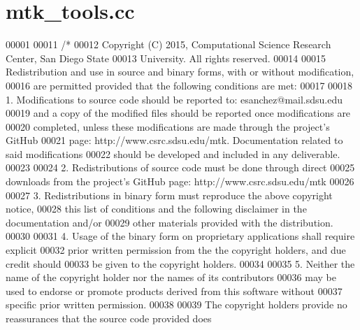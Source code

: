 \hypertarget{mtk__tools_8cc_source}{\section{mtk\+\_\+tools.\+cc}
\label{mtk__tools_8cc_source}
}

\begin{DoxyCode}
00001 
00011 \textcolor{comment}{/*}
00012 \textcolor{comment}{Copyright (C) 2015, Computational Science Research Center, San Diego State}
00013 \textcolor{comment}{University. All rights reserved.}
00014 \textcolor{comment}{}
00015 \textcolor{comment}{Redistribution and use in source and binary forms, with or without modification,}
00016 \textcolor{comment}{are permitted provided that the following conditions are met:}
00017 \textcolor{comment}{}
00018 \textcolor{comment}{1. Modifications to source code should be reported to: esanchez@mail.sdsu.edu}
00019 \textcolor{comment}{and a copy of the modified files should be reported once modifications are}
00020 \textcolor{comment}{completed, unless these modifications are made through the project's GitHub}
00021 \textcolor{comment}{page: http://www.csrc.sdsu.edu/mtk. Documentation related to said modifications}
00022 \textcolor{comment}{should be developed and included in any deliverable.}
00023 \textcolor{comment}{}
00024 \textcolor{comment}{2. Redistributions of source code must be done through direct}
00025 \textcolor{comment}{downloads from the project's GitHub page: http://www.csrc.sdsu.edu/mtk}
00026 \textcolor{comment}{}
00027 \textcolor{comment}{3. Redistributions in binary form must reproduce the above copyright notice,}
00028 \textcolor{comment}{this list of conditions and the following disclaimer in the documentation and/or}
00029 \textcolor{comment}{other materials provided with the distribution.}
00030 \textcolor{comment}{}
00031 \textcolor{comment}{4. Usage of the binary form on proprietary applications shall require explicit}
00032 \textcolor{comment}{prior written permission from the the copyright holders, and due credit should}
00033 \textcolor{comment}{be given to the copyright holders.}
00034 \textcolor{comment}{}
00035 \textcolor{comment}{5. Neither the name of the copyright holder nor the names of its contributors}
00036 \textcolor{comment}{may be used to endorse or promote products derived from this software without}
00037 \textcolor{comment}{specific prior written permission.}
00038 \textcolor{comment}{}
00039 \textcolor{comment}{The copyright holders provide no reassurances that the source code provided does}

\end{DoxyCode}
